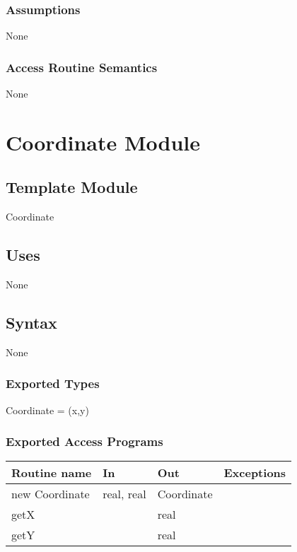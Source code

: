 \documentclass[12pt,fleqn]{article}
\begin{document}
    \subsubsection* {Assumptions}
    None

    \subsubsection* {Access Routine Semantics}
    None

    \newpage

\section* {Coordinate Module}

    \subsection* {Template Module}

    Coordinate

    \subsection* {Uses}
    None

    \subsection* {Syntax}
    None

    \subsubsection* {Exported Types}

    Coordinate = (x,y)

    \subsubsection* {Exported Access Programs}

    \begin{tabular}{| l | l | l | l |}
    \hline
    \textbf{Routine name} & \textbf{In} & \textbf{Out} & \textbf{Exceptions}\\
    \hline
    new Coordinate & real, real & Coordinate & ~\\
    \hline
    getX & ~ & real & ~\\
    \hline
    getY & ~ & real & ~\\
    \hline
    \end{tabular}
\end{document}
